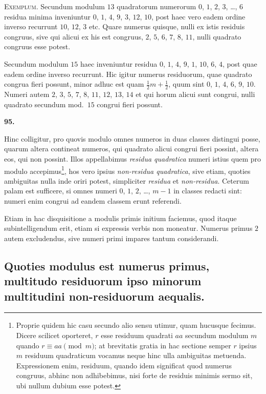 \documentclass[12pt,a4paper]{article}
\theoremstyle{plain}
\theoremstyle{definition}
\theoremstyle{remark}
\begin{document}
\textsc{Exemplum.} Secundum modulum $13$ quadratorum numerorum $0$, $1$, $2$, $3$, \ldots, $6$ residua minima inveniuntur $0$, $1$, $4$, $9$, $3$, $12$, $10$, post haec vero eadem ordine inverso recurrunt $10$, $12$, $3$ etc. Quare numerus quisque, nulli ex istis residuis congruus, sive qui alicui ex his est congruus, $2$, $5$, $6$, $7$, $8$, $11$, nulli quadrato congruus esse potest.

Secundum modulum $15$ haec inveniuntur residua $0$, $1$, $4$, $9$, $1$, $10$, $6$, $4$, post quae eadem ordine inverso recurrunt. Hic igitur numerus residuorum, quae quadrato congrua fieri possunt, minor adhuc est quam $\frac{1}{2}m+\frac{1}{2}$, quum sint $0$, $1$, $4$, $6$, $9$, $10$. Numeri autem $2$, $3$, $5$, $7$, $8$, $11$, $12$, $13$, $14$ et qui horum alicui sunt congrui, nulli quadrato secundum mod.~$15$ congrui fieri possunt.

\setcounter{satz}{95}
\addtocounter{satz}{-1}
\textbf{95.}

Hinc colligitur, pro quovis modulo omnes numeros in duas classes distingui posse, quarum altera contineat numeros, qui quadrato alicui congrui fieri possint, altera eos, qui non possint. Illos appellabimus \emph{residua quadratica} numeri istius quem pro modulo accepimus\footnote{Proprie quidem hic casu secundo alio sensu utimur, quam hucusque fecimus. Dicere scilicet oporteret, $r$ esse residuum quadrati $aa$ secundum modulum $m$ quando $r \equiv aa \pmod{m}$; at brevitatis gratia in hac sectione semper $r$ ipsius $m$ residuum quadraticum vocamus neque hinc ulla ambiguitas metuenda. Expressionem enim, residuum, quando idem significat quod numerus congruus, abhinc non adhibebimus, nisi forte de residuis minimis sermo sit, ubi nullum dubium esse potest.}, hos vero ipsius \emph{non-residua quadratica}, sive etiam, quoties ambiguitas nulla inde oriri potest, simpliciter \emph{residua} et \emph{non-residua}. Ceterum palam est sufficere, si omnes numeri $0$, $1$, $2$, \ldots, $m-1$ in classes redacti sint: numeri enim congrui ad eandem classem erunt referendi.

Etiam in hac disquisitione a modulis primis initium faciemus, quod itaque subintelligendum erit, etiam si expressis verbis non moneatur. Numerus primus $2$ autem excludendus, sive numeri primi impares tantum considerandi.

\subsection*{Quoties modulus est numerus primus, multitudo residuorum ipso minorum multitudini non-residuorum aequalis.}
\end{document}
